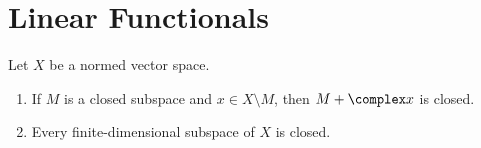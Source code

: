 \documentclass[article, a4paper, 11pt, oneside]{memoir}
\numberwithin{equation}{chapter}
\theoremstyle{nonumberplain}
\begin{document}
\section{Linear Functionals}

\newcommand{\cat}[1]{\mathcal{#1}}
\newcommand{\scat}[1]{\mathbf{#1}} %
\newcommand{\ncat}[1]{\mathbf{#1}} %

\newcommand{\catNor}{\ncat{Nor}}
\newcommand{\catBan}{\ncat{Ban}}
\newcommand{\catSet}{\ncat{Set}}


\begin{exerciseframed*}[18]
	Let $X$ be a normed vector space.
	\begin{enumerate}
		\item If $M$ is a closed subspace and $x \in X \setminus M$, then $M + \complex x$ is closed.
		\item Every finite-dimensional subspace of $X$ is closed.
	\end{enumerate}
\end{exerciseframed*}
\end{document}
